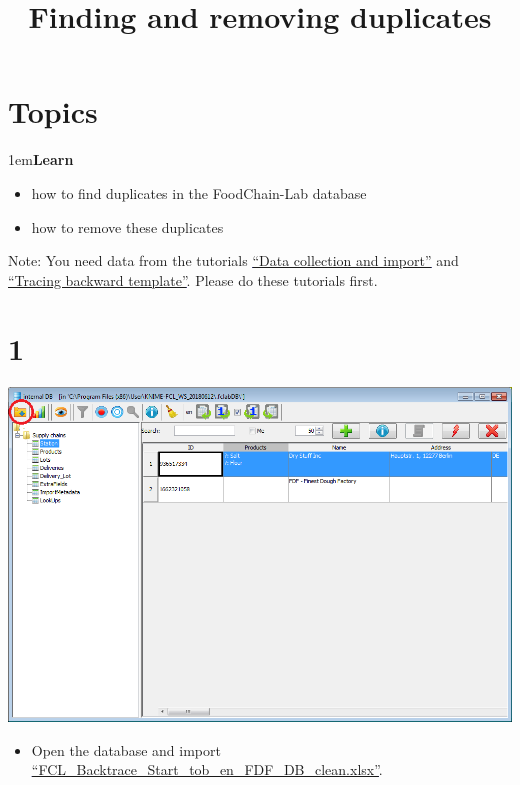 \documentclass[10pt]{beamer}
\title{Finding and removing duplicates}
\date{}
\begin{document}
\maketitle

\section{Topics}
\begin{frame}
\leftskip1em\textbf{Learn}
	\begin{itemize}
		\item how to find duplicates in the FoodChain-Lab database
		\item how to remove these duplicates
	\end{itemize}
\vspace*{\fill}
Note: You need data from the tutorials \textcolor{blue}{\underline{\href{https://foodrisklabs.bfr.bund.de/data-collection-and-import/}{``Data collection and import''}}} and \textcolor{blue}{\underline{\href{https://foodrisklabs.bfr.bund.de/templatebacktracing/}{``Tracing backward template''}}}. Please do these tutorials first.
\end{frame}

\section{1}
\begin{frame}
	\begin{center}
			\includegraphics[height=0.6\textheight]{1.png}
	\end{center}
	\begin{itemize}
		\item Open the database and import \textcolor{blue}{\underline{\href{https://github.com/SiLeBAT/BfROpenLabResources/raw/master/GitHubPages/documents/FCL\_Finding\_And\_Removing\_Duplicates/FCL\_Backtrace\_Start\_tob\_en\_FDF\_DB\_clean.xlsx}{``FCL\_Backtrace\_Start\_tob\_en\_FDF\_DB\_clean.xlsx''}}}.
	\end{itemize}
\end{frame}
\end{document}
